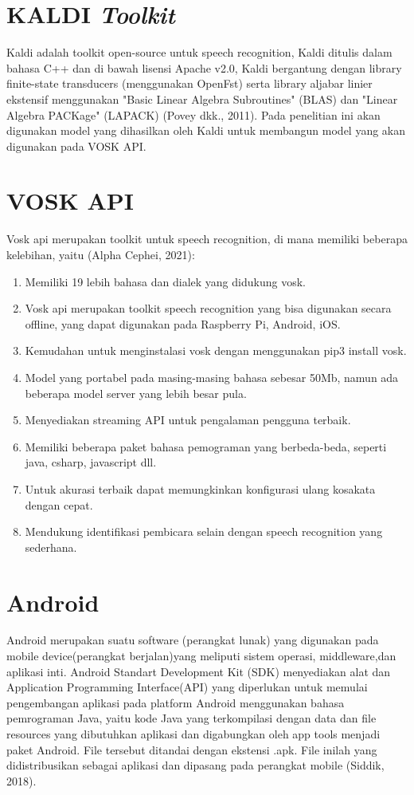 \section{KALDI \textit{Toolkit}}
Kaldi adalah toolkit open-source untuk speech recognition, Kaldi ditulis dalam bahasa C++ dan di bawah lisensi Apache v2.0, Kaldi bergantung dengan library finite-state transducers (menggunakan OpenFst) serta library aljabar linier ekstensif menggunakan "Basic Linear Algebra Subroutines" (BLAS) dan "Linear Algebra PACKage" (LAPACK) (Povey dkk., 2011). Pada penelitian ini akan digunakan model yang dihasilkan oleh Kaldi untuk membangun model yang akan digunakan pada VOSK API.


\section{VOSK API}
Vosk api merupakan toolkit untuk speech recognition, di mana memiliki beberapa kelebihan, yaitu (Alpha Cephei, 2021):
\begin{enumerate}
\item Memiliki 19 lebih bahasa dan dialek yang didukung vosk.
\item Vosk api merupakan toolkit speech recognition yang bisa digunakan secara offline, yang dapat digunakan pada Raspberry Pi, Android, iOS.
\item Kemudahan untuk menginstalasi vosk dengan menggunakan pip3 install vosk.
\item Model yang portabel pada masing-masing bahasa sebesar 50Mb, namun ada beberapa model server yang lebih besar pula.
\item Menyediakan streaming API untuk pengalaman pengguna terbaik.
\item Memiliki beberapa paket bahasa pemograman yang berbeda-beda, seperti java, csharp, javascript dll.
\item Untuk akurasi terbaik dapat memungkinkan konfigurasi ulang kosakata dengan cepat.
\item Mendukung identifikasi pembicara selain dengan speech recognition yang sederhana.

\end{enumerate}

\section{Android}
Android merupakan suatu software (perangkat lunak) yang digunakan pada mobile device(perangkat berjalan)yang meliputi sistem operasi, middleware,dan aplikasi inti. Android Standart Development Kit (SDK) menyediakan alat dan Application Programming Interface(API) yang diperlukan untuk memulai pengembangan aplikasi pada platform Android menggunakan bahasa pemrograman Java, yaitu kode Java yang terkompilasi dengan data dan file resources yang dibutuhkan aplikasi dan digabungkan oleh app tools menjadi paket Android. File tersebut ditandai dengan ekstensi .apk. File inilah yang didistribusikan sebagai aplikasi dan dipasang pada perangkat mobile (Siddik, 2018).

